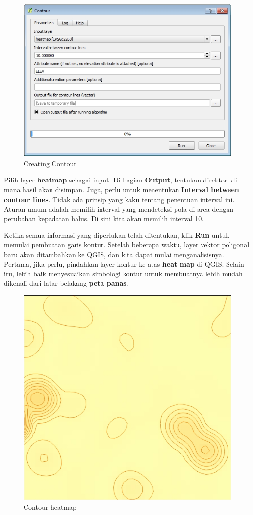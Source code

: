 \documentclass[]{book}
\begin{document}
\begin{figure}

{\centering \includegraphics[width=0.8\linewidth]{images/04/fig82} 

}

\caption{Creating Contour}\label{fig:fig1482}
\end{figure}

Pilih layer \textbf{heatmap} sebagai input. Di bagian \textbf{Output}, tentukan direktori di mana hasil akan disimpan. Juga, perlu untuk menentukan \textbf{Interval between contour lines}. Tidak ada prinsip yang kaku tentang penentuan interval ini. Aturan umum adalah memilih interval yang mendeteksi pola di area dengan perubahan kepadatan halus. Di sini kita akan memilih interval 10.

Ketika semua informasi yang diperlukan telah ditentukan, klik \textbf{Run} untuk memulai pembuatan garis kontur. Setelah beberapa waktu, layer vektor poligonal baru akan ditambahkan ke QGIS, dan kita dapat mulai menganalisisnya. Pertama, jika perlu, pindahkan layer kontur ke atas \textbf{heat map} di QGIS. Selain itu, lebih baik menyesuaikan simbologi kontur untuk membuatnya lebih mudah dikenali dari latar belakang \textbf{peta panas}.

\begin{figure}

{\centering \includegraphics[width=0.8\linewidth]{images/04/fig83} 

}

\caption{Contour heatmap}\label{fig:fig1483}
\end{figure}
\end{document}
